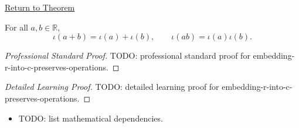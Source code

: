 \newpage
{}
\label{prf:embedding-r-into-c-preserves-operations}

\begin{remark*}[Return]
\hyperref[thm:embedding-r-into-c-preserves-operations]{Return to Theorem}
\end{remark*}

\begin{theorem*}
For all \(a,b\in\mathbb{R}\),
\[
\iota(a+b)=\iota(a)+\iota(b),
\qquad
\iota(ab)=\iota(a)\iota(b).
\]
\end{theorem*}

\begin{proof}[Professional Standard Proof]
\LRAProofBodyStart
TODO: professional standard proof for embedding-r-into-c-preserves-operations.
\end{proof}

\begin{proof}[Detailed Learning Proof]
\LRAProofBodyStart
TODO: detailed learning proof for embedding-r-into-c-preserves-operations.
\end{proof}

\begin{remark*}
\end{remark*}

\begin{dependencies}
\begin{itemize}
  \item TODO: list mathematical dependencies.
\end{itemize}
\end{dependencies}

\clearpage
